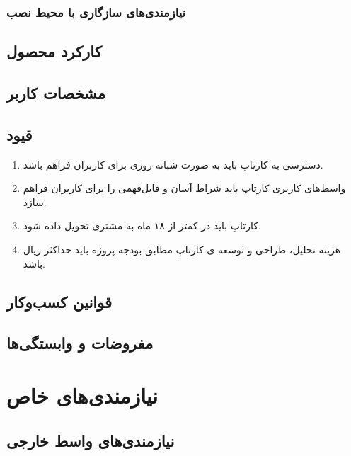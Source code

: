 \documentclass{report}
\begin{document}
				\subsubsection{نیازمندی‌های سازگاری با محیط نصب}
			\subsection{کارکرد محصول}
			\subsection{مشخصات کاربر}
			\subsection{قیود}
				\begin{enumerate}
					\item 
					دسترسی به کارتاپ باید به صورت شبانه روزی برای کاربران فراهم باشد.
					\item 
					واسط‌های کاربری کارتاپ باید شراط آسان و قابل‌فهمی را برای کاربران فراهم سازد.
					\item 
					کارتاپ باید در کمتر از ۱۸ ماه به مشتری تحویل داده شود.
					\item 
					 هزینه تحلیل، طراحی و توسعه ی کارتاپ مطابق بودجه پروژه باید حداکثر  ریال باشد.
				\end{enumerate}
			\subsection{قوانین کسب‌و‌کار}
			\subsection{مفروضات و وابستگی‌ها}
			
		\section{نیازمندی‌های خاص}
			\subsection{نیازمندی‌های واسط خارجی}
\end{document}
